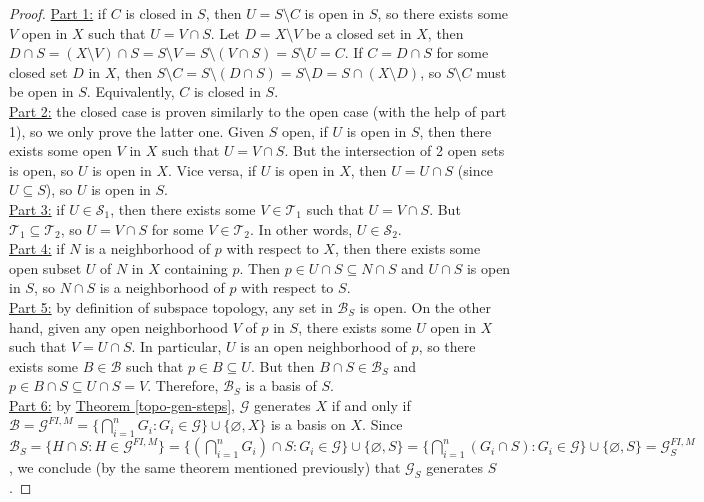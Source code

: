\documentclass{treatise}
\begin{document}
\begin{proof}
\underline{Part 1:} if $C$ is closed in $S$, then $U = S \setminus C$ is open in $S$, so there exists some $V$ open in $X$ such that $U = V \cap S$. Let $D = X \setminus V$ be a closed set in $X$, then $D \cap S = (X \setminus V) \cap S = S \setminus V = S \setminus (V \cap S) = S \setminus U = C$. If $C = D \cap S$ for some closed set $D$ in $X$, then $S \setminus C = S \setminus (D \cap S) = S \setminus D = S \cap (X \setminus D)$, so $S \setminus C$ must be open in $S$. Equivalently, $C$ is closed in $S$.
\\
\underline{Part 2:} the closed case is proven similarly to the open case (with the help of part 1), so we only prove the latter one. Given $S$ open, if $U$ is open in $S$, then there exists some open $V$ in $X$ such that $U = V \cap S$. But the intersection of 2 open sets is open, so $U$ is open in $X$. Vice versa, if $U$ is open in $X$, then $U = U \cap S$ (since $U \subseteq S$), so $U$ is open in $S$.
\\
\underline{Part 3:} if $U \in \mathcal{S}_1$, then there exists some $V \in \mathcal{T}_1$ such that $U = V \cap S$. But $\mathcal{T}_1 \subseteq \mathcal{T}_2$, so $U = V \cap S$ for some $V \in \mathcal{T}_2$. In other words, $U \in \mathcal{S}_2$.
\\
\underline{Part 4:} if $N$ is a neighborhood of $p$ with respect to $X$, then there exists some open subset $U$ of $N$ in $X$ containing $p$. Then $p \in U \cap S \subseteq N \cap S$ and $U \cap S$ is open in $S$, so $N \cap S$ is a neighborhood of $p$ with respect to $S$.
\\
\underline{Part 5:} by definition of subspace topology, any set in $\mathcal{B}_S$ is open. On the other hand, given any open neighborhood $V$ of $p$ in $S$, there exists some $U$ open in $X$ such that $V = U \cap S$. In particular, $U$ is an open neighborhood of $p$, so there exists some $B \in \mathcal{B}$ such that $p \in B \subseteq U$. But then $B \cap S \in \mathcal{B}_S$ and $p \in B \cap S \subseteq U \cap S = V$. Therefore, $\mathcal{B}_S$ is a basis of $S$.
\\
\underline{Part 6:} by \hyperref[topo-gen-steps]{Theorem \ref*{topo-gen-steps}}, $\mathcal{G}$ generates $X$ if and only if $\mathcal{B} = \mathcal{G}^{FI, M} = \{ \bigcap_{i = 1}^n G_i : G_i \in \mathcal{G} \} \cup \{ \varnothing, X \}$ is a basis on $X$. Since $\mathcal{B}_S = \{ H \cap S : H \in \mathcal{G}^{FI, M} \} = \{ (\bigcap_{i = 1}^n G_i) \cap S : G_i \in \mathcal{G} \} \cup \{ \varnothing, S \} = \{ \bigcap_{i = 1}^n (G_i \cap S) : G_i \in \mathcal{G} \} \cup \{ \varnothing, S \} = \mathcal{G}_S^{FI, M}$, we conclude (by the same theorem mentioned previously) that $\mathcal{G}_S$ generates $S$.
\end{proof}
\end{document}
